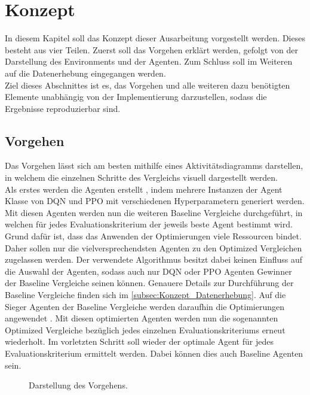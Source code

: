 \chapter{Konzept} \label{chap:Konzept}
In diesem Kapitel soll das Konzept dieser Ausarbeitung vorgestellt werden. Dieses besteht aus vier Teilen. Zuerst soll das Vorgehen erklärt werden, gefolgt von der Darstellung des Environments und der Agenten. Zum Schluss soll im Weiteren auf die Datenerhebung eingegangen werden.\\
Ziel dieses Abschnittes ist es, das Vorgehen und alle weiteren dazu benötigten Elemente unabhängig von der Implementierung darzustellen, sodass die Ergebnisse reproduzierbar sind.

\section{Vorgehen} \label{sec:Konzept_Vorgehen}
Das Vorgehen lässt sich am besten mithilfe eines Aktivitätsdiagramms darstellen, in welchem die einzelnen Schritte des Vergleichs visuell dargestellt werden.\\
Als erstes werden die Agenten erstellt , indem mehrere Instanzen der Agent Klasse von DQN und PPO mit verschiedenen Hyperparametern generiert werden.\\
Mit diesen Agenten werden nun die weiteren Baseline Vergleiche durchgeführt, in welchen für jedes Evaluationskriterium der jeweils beste Agent bestimmt wird. Grund dafür ist, dass das Anwenden der Optimierungen viele Ressourcen bindet. Daher sollen nur die vielversprechendsten Agenten zu den Optimized Vergleichen zugelassen werden.
Der verwendete Algorithmus besitzt dabei keinen Einfluss auf die Auswahl der Agenten, sodass auch nur DQN oder PPO Agenten Gewinner der Baseline Vergleiche seinen können. Genauere Details zur Durchführung der Baseline Vergleiche finden sich im \autoref{subsec:Konzept_Datenerhebung}.
Auf die Sieger Agenten der Baseline Vergleiche werden daraufhin die Optimierungen angewendet . 
Mit diesen optimierten Agenten werden nun die sogenannten Optimized Vergleiche bezüglich jedes einzelnen Evaluationskriteriums  erneut wiederholt. Im vorletzten Schritt soll wieder der optimale Agent für jedes Evaluationskriterium ermittelt werden. Dabei können dies auch Baseline Agenten sein.
\begin{figure}[H]
	\centering
	
	\caption[Aktivitätsdiagramm des Vorgehens]{Darstellung des Vorgehens.}
	\label{fig:Konzept_Vorgehen}
\end{figure}
